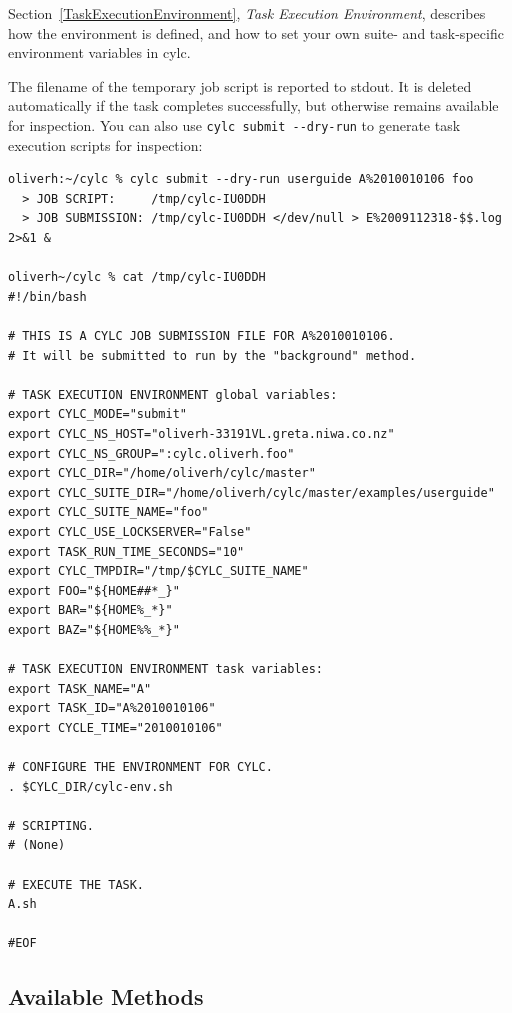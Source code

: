 \documentclass[11pt,a4paper]{article}
\begin{document}
\lstset{language=bash}

Section~\ref{TaskExecutionEnvironment}, {\em Task Execution
Environment}, describes how the environment is defined, and how to set
your own suite- and task-specific environment variables in cylc.

The filename of the temporary job script is reported to
stdout. It is deleted automatically if the task completes successfully,
but otherwise remains available for inspection.  You can also use
\lstinline=cylc submit --dry-run= to generate task
execution scripts for inspection:


\begin{lstlisting}
oliverh:~/cylc % cylc submit --dry-run userguide A%2010010106 foo
  > JOB SCRIPT:     /tmp/cylc-IU0DDH
  > JOB SUBMISSION: /tmp/cylc-IU0DDH </dev/null > E%2009112318-$$.log 2>&1 &
  
oliverh~/cylc % cat /tmp/cylc-IU0DDH
#!/bin/bash

# THIS IS A CYLC JOB SUBMISSION FILE FOR A%2010010106.
# It will be submitted to run by the "background" method.

# TASK EXECUTION ENVIRONMENT global variables:
export CYLC_MODE="submit"
export CYLC_NS_HOST="oliverh-33191VL.greta.niwa.co.nz"
export CYLC_NS_GROUP=":cylc.oliverh.foo"
export CYLC_DIR="/home/oliverh/cylc/master"
export CYLC_SUITE_DIR="/home/oliverh/cylc/master/examples/userguide"
export CYLC_SUITE_NAME="foo"
export CYLC_USE_LOCKSERVER="False"
export TASK_RUN_TIME_SECONDS="10"
export CYLC_TMPDIR="/tmp/$CYLC_SUITE_NAME"
export FOO="${HOME##*_}"
export BAR="${HOME%_*}"
export BAZ="${HOME%%_*}"

# TASK EXECUTION ENVIRONMENT task variables:
export TASK_NAME="A"
export TASK_ID="A%2010010106"
export CYCLE_TIME="2010010106"

# CONFIGURE THE ENVIRONMENT FOR CYLC.
. $CYLC_DIR/cylc-env.sh

# SCRIPTING.
# (None)

# EXECUTE THE TASK.
A.sh

#EOF
\end{lstlisting}

\subsection{Available Methods}
\label{AvailableMethods}
\end{document}
